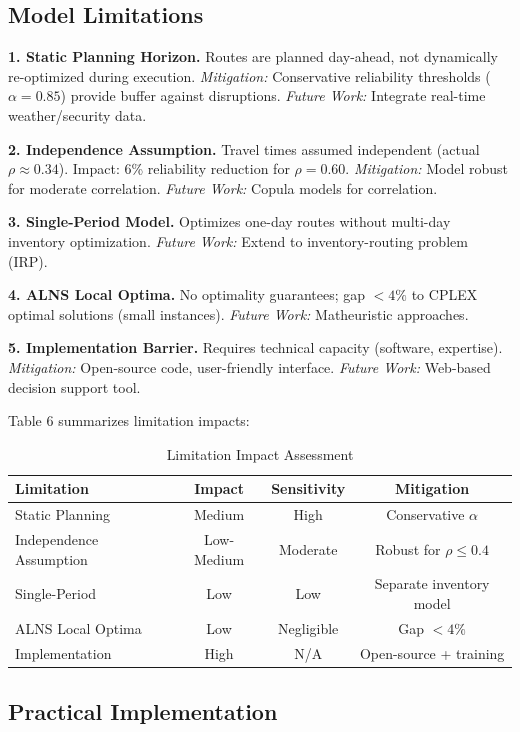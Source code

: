 \subsection{Model Limitations}

\textbf{1. Static Planning Horizon.} Routes are planned day-ahead, not dynamically re-optimized during execution. \textit{Mitigation:} Conservative reliability thresholds ($\alpha = 0.85$) provide buffer against disruptions. \textit{Future Work:} Integrate real-time weather/security data.

\textbf{2. Independence Assumption.} Travel times assumed independent (actual $\rho \approx 0.34$). Impact: 6\% reliability reduction for $\rho = 0.60$. \textit{Mitigation:} Model robust for moderate correlation. \textit{Future Work:} Copula models for correlation.

\textbf{3. Single-Period Model.} Optimizes one-day routes without multi-day inventory optimization. \textit{Future Work:} Extend to inventory-routing problem (IRP).

\textbf{4. ALNS Local Optima.} No optimality guarantees; gap $< 4\%$ to CPLEX optimal solutions (small instances). \textit{Future Work:} Matheuristic approaches.

\textbf{5. Implementation Barrier.} Requires technical capacity (software, expertise). \textit{Mitigation:} Open-source code, user-friendly interface. \textit{Future Work:} Web-based decision support tool.

Table 6 summarizes limitation impacts:

\begin{table}[H]
\centering
\caption{Limitation Impact Assessment}
\begin{tabular}{lccc}
\toprule
Limitation & Impact & Sensitivity & Mitigation \\
\midrule
Static Planning & Medium & High & Conservative $\alpha$ \\
Independence Assumption & Low-Medium & Moderate & Robust for $\rho \leq 0.4$ \\
Single-Period & Low & Low & Separate inventory model \\
ALNS Local Optima & Low & Negligible & Gap $< 4\%$ \\
Implementation & High & N/A & Open-source + training \\
\bottomrule
\end{tabular}
\end{table}

\subsection{Practical Implementation}

